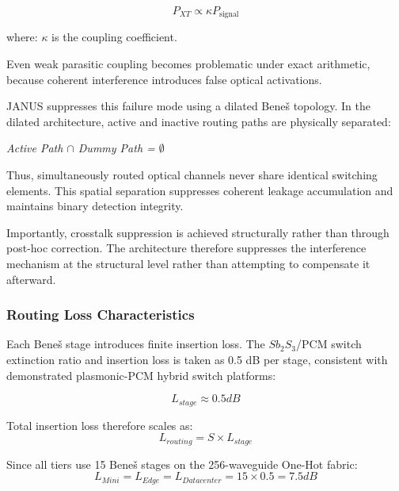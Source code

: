 \documentclass[journal]{IEEEtran}
\begin{document}
\begin{equation}
P_{XT} \propto \kappa P_{\text{signal}}
\end{equation}

where: $\kappa$ is the coupling coefficient.

Even weak parasitic coupling becomes problematic under exact arithmetic, because coherent interference introduces false optical activations.

JANUS suppresses this failure mode using a dilated Beneš topology. In the dilated architecture, active and inactive routing paths are physically separated:

\begin{center}
\textit{Active Path $\cap$ Dummy Path = $\emptyset$}
\end{center}

Thus, simultaneously routed optical channels never share identical switching elements. This spatial separation suppresses coherent leakage accumulation and maintains binary detection integrity.

Importantly, crosstalk suppression is achieved structurally rather than through post-hoc correction. The architecture therefore suppresses the interference mechanism at the structural level rather than attempting to compensate it afterward.

\subsubsection{\textbf{Routing Loss Characteristics}}

Each Beneš stage introduces finite insertion loss. The $Sb_2S_3$/PCM switch extinction ratio and insertion loss is taken as 0.5 dB per stage, consistent with demonstrated plasmonic-PCM hybrid switch platforms:

\begin{equation}
L_{stage} \approx 0.5 dB
\end{equation}

Total insertion loss therefore scales as:
\begin{equation}
L_{routing} = S \times L_{stage}
\end{equation}

Since all tiers use 15 Beneš stages on the 256-waveguide One-Hot fabric:
\begin{equation}
L_{Mini} = L_{Edge} = L_{Datacenter} = 15 \times 0.5 = 7.5 dB
\end{equation}
\end{document}

